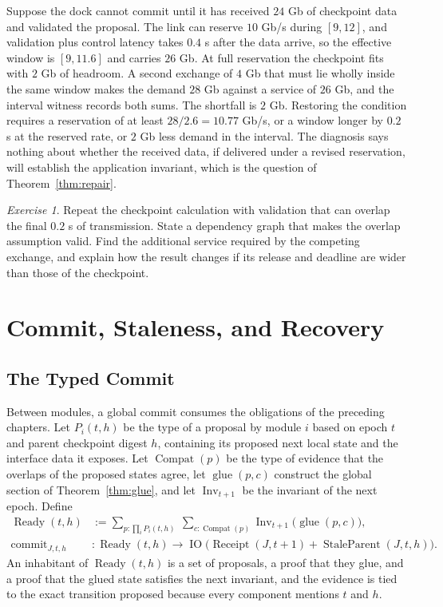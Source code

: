 \documentclass[11pt,openany]{book}
\theoremstyle{plain}
\theoremstyle{definition}
\theoremstyle{remark}
\newtheorem{exercise}[theorem]{Exercise}
\begin{document}
Suppose the dock cannot commit until it has received $24$ Gb of checkpoint data and validated the proposal. The link can reserve $10$ Gb/s during $[9,12]$, and validation plus control latency takes $0.4$ s after the data arrive, so the effective window is $[9,11.6]$ and carries $26$ Gb. At full reservation the checkpoint fits with $2$ Gb of headroom. A second exchange of $4$ Gb that must lie wholly inside the same window makes the demand $28$ Gb against a service of $26$ Gb, and the interval witness records both sums. The shortfall is $2$ Gb. Restoring the condition requires a reservation of at least $28/2.6=10.77$ Gb/s, or a window longer by $0.2$ s at the reserved rate, or $2$ Gb less demand in the interval. The diagnosis says nothing about whether the received data, if delivered under a revised reservation, will establish the application invariant, which is the question of Theorem~\ref{thm:repair}.

\begin{exercise}
Repeat the checkpoint calculation with validation that can overlap the final $0.2$ s of transmission. State a dependency graph that makes the overlap assumption valid. Find the additional service required by the competing exchange, and explain how the result changes if its release and deadline are wider than those of the checkpoint.
\end{exercise}

\chapter{Commit, Staleness, and Recovery}
\label{ch:commit}

\section{The Typed Commit}

Between modules, a global commit consumes the obligations of the preceding chapters. Let $P_i(t,h)$ be the type of a proposal by module $i$ based on epoch $t$ and parent checkpoint digest $h$, containing its proposed next local state and the interface data it exposes. Let $\operatorname{Compat}(p)$ be the type of evidence that the overlaps of the proposed states agree, let $\operatorname{glue}(p,c)$ construct the global section of Theorem~\ref{thm:glue}, and let $\operatorname{Inv}_{t+1}$ be the invariant of the next epoch. Define
\[
\begin{aligned}
\operatorname{Ready}(t,h)&:=\sum_{p:\prod_iP_i(t,h)}\ \sum_{c:\operatorname{Compat}(p)}\operatorname{Inv}_{t+1}\bigl(\operatorname{glue}(p,c)\bigr),\\
\operatorname{commit}_{J,t,h}&:\operatorname{Ready}(t,h)\longrightarrow\operatorname{IO}\bigl(\operatorname{Receipt}(J,t+1)+\operatorname{StaleParent}(J,t,h)\bigr).
\end{aligned}
\]
An inhabitant of $\operatorname{Ready}(t,h)$ is a set of proposals, a proof that they glue, and a proof that the glued state satisfies the next invariant, and the evidence is tied to the exact transition proposed because every component mentions $t$ and $h$.
\end{document}
